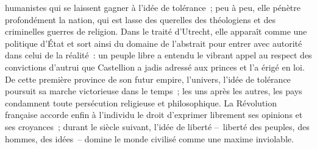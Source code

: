 \documentclass[french,twoside]{book} %
\newcommand{\astermono}{\medskip\centerline{\color{rubric}\large\selectfont{\syms ✻}}\medskip\par}%
\begin{document}
humanistes qui se laissent gagner à l’idée de tolérance ; peu à peu, elle pénètre profondément la nation, qui est lasse des querelles des théologiens et des criminelles guerres de religion. Dans le traité d’Utrecht, elle apparaît comme une politique d’État et sort ainsi du domaine de l’abstrait pour entrer avec autorité dans celui de la réalité : un peuple libre a entendu le vibrant appel au respect des convictions d’autrui que Castellion a jadis adressé aux princes et l’a érigé en loi. De cette première province de son futur empire, l’univers, l’idée de tolérance poursuit sa marche victorieuse dans le temps ; les uns après les autres, les pays condamnent toute persécution religieuse et philosophique. La Révolution française accorde enfin à l’individu le droit d’exprimer librement ses opinions et ses croyances ; durant le siècle suivant, l’idée de liberté – liberté des peuples, des hommes, des idées – domine le monde civilisé comme une maxime inviolable.\par

\astermono
\end{document}
